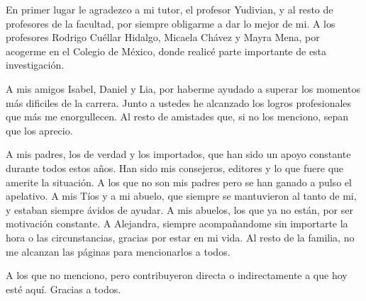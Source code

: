\begin{acknowledgements}
    En primer lugar le agradezco a mi tutor, el profesor Yudivian, y al resto de profesores de la facultad, por siempre obligarme a dar lo mejor de mi. A los profesores Rodrigo Cuéllar Hidalgo, Micaela Chávez y Mayra Mena, por acogerme en el Colegio de México, donde realicé parte importante de esta investigación.
    
    A mis amigos Isabel, Daniel y Lia, por haberme ayudado a superar los momentos más dificiles de la carrera. Junto a ustedes he alcanzado los logros profesionales que más me enorgullecen. Al resto de amistades que, si no los menciono, sepan que los aprecio.

    A mis padres, los de verdad y los importados, que han sido un apoyo constante durante todos estos años. Han sido mis consejeros, editores y lo que fuere que amerite la situación. A los que no son mis padres pero se han ganado a pulso el apelativo. A mis Tíos y a mi abuelo, que siempre se mantuvieron al tanto de mi, y estaban siempre ávidos de ayudar. A mis abuelos, los que ya no están, por ser motivación constante. A Alejandra, siempre acompañandome sin importarte la hora o las circunstancias, gracias por estar en mi vida. Al resto de la familia, no me alcanzan las páginas para mencionarlos a todos.

    A los que no menciono, pero contribuyeron directa o indirectamente a que hoy esté aquí. Gracias a todos.
\end{acknowledgements}